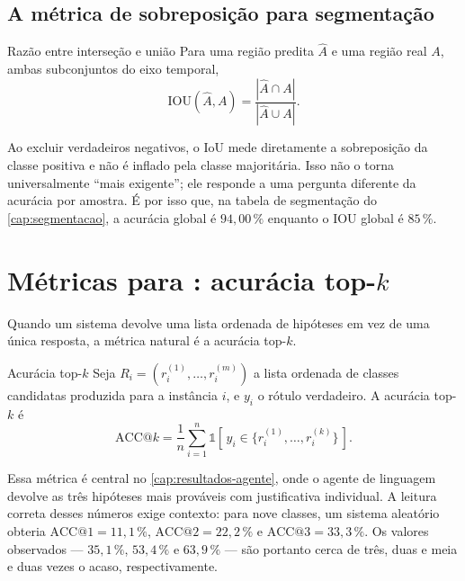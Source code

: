 \subsection{A métrica de sobreposição para segmentação}

\begin{definicao}{Razão entre interseção e união}
Para uma região predita $\hat{A}$ e uma região real $A$, ambas subconjuntos do eixo
temporal,
\begin{equation}
  \text{IOU}(\hat{A}, A) = \frac{|\hat{A} \cap A|}{|\hat{A} \cup A|}.
  \label{eq:iou}
\end{equation}
\end{definicao}

Ao excluir verdadeiros negativos, o IoU mede diretamente a sobreposição da classe
positiva e não é inflado pela classe majoritária. Isso não o torna universalmente
``mais exigente''; ele responde a uma pergunta diferente da acurácia por amostra. É
por isso que, na tabela de segmentação do \cref{cap:segmentacao}, a acurácia global é
$94{,}00\,\%$ enquanto o IOU global é $85\,\%$.

\section{Métricas para : acurácia top-$k$}

Quando um sistema devolve uma lista ordenada de hipóteses em vez de uma única resposta,
a métrica natural é a acurácia top-$k$.

\begin{definicao}{Acurácia top-$k$}
Seja $R_i = (r_i^{(1)}, \dots, r_i^{(m)})$ a lista ordenada de classes candidatas
produzida para a instância $i$, e $y_i$ o rótulo verdadeiro. A acurácia top-$k$ é
\begin{equation}
  \text{ACC}@k = \frac{1}{n} \sum_{i=1}^{n}
  \mathbb{1}\!\left[\, y_i \in \{ r_i^{(1)}, \dots, r_i^{(k)} \} \,\right].
  \label{eq:topk}
\end{equation}
\end{definicao}

Essa métrica é central no \cref{cap:resultados-agente}, onde o agente de linguagem
devolve as três hipóteses mais prováveis com justificativa individual. A leitura
correta desses números exige contexto: para nove classes, um sistema aleatório obteria
$\text{ACC}@1 = 11{,}1\,\%$, $\text{ACC}@2 = 22{,}2\,\%$ e
$\text{ACC}@3 = 33{,}3\,\%$. Os valores observados --- $35{,}1\,\%$, $53{,}4\,\%$ e
$63{,}9\,\%$ --- são portanto cerca de três, duas e meia e duas vezes o acaso,
respectivamente.

